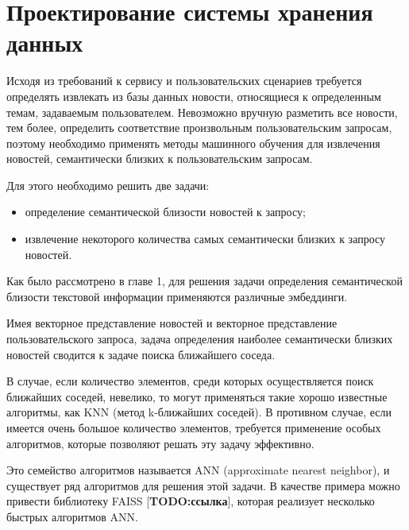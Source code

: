 \section{Проектирование системы хранения данных}
Исходя из требований к сервису и пользовательских сценариев требуется определять извлекать из базы данных новости, относящиеся к определенным темам, задаваемым пользователем. Невозможно вручную разметить все новости, тем более, определить соответствие произвольным пользовательским запросам, поэтому необходимо применять методы машинного обучения для извлечения новостей, семантически близких к пользовательским запросам.

Для этого необходимо решить две задачи:
\begin{itemize}
    \item определение семантической близости новостей к запросу;
    \item извлечение некоторого количества самых семантически близких к запросу новостей.
\end{itemize}

Как было рассмотрено в главе 1, для решения задачи определения семантической близости текстовой информации применяются различные эмбеддинги.

Имея векторное представление новостей и векторное представление пользовательского запроса, задача определения наиболее семантически близких новостей сводится к задаче поиска ближайшего соседа.

В случае, если количество элементов, среди которых осуществляется поиск ближайших соседей, невелико, то могут применяться такие хорошо известные алгоритмы, как KNN (метод k-ближайших соседей). В противном случае, если имеется очень большое количество элементов, требуется применение особых алгоритмов, которые позволяют решать эту задачу эффективно.

Это семейство алгоритмов называется ANN (approximate nearest neighbor), и существует ряд алгоритмов для решения этой задачи. В качестве примера можно привести библиотеку FAISS [\textbf{TODO:ссылка}], которая реализует несколько быстрых алгоритмов ANN.

